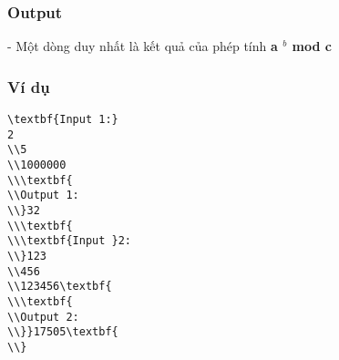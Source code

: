 \subsubsection{   Output  }

    - Một dòng duy nhất là kết quả của phép tính    \textbf{     a     $^      b     $     mod c    }

\subsubsection{   Ví dụ  }
\begin{verbatim}
\textbf{Input 1:}
2
\\5
\\1000000
\\\textbf{
\\Output 1:
\\}32
\\\textbf{
\\\textbf{Input }2:
\\}123
\\456
\\123456\textbf{
\\\textbf{
\\Output 2:
\\}}17505\textbf{
\\}\end{verbatim}